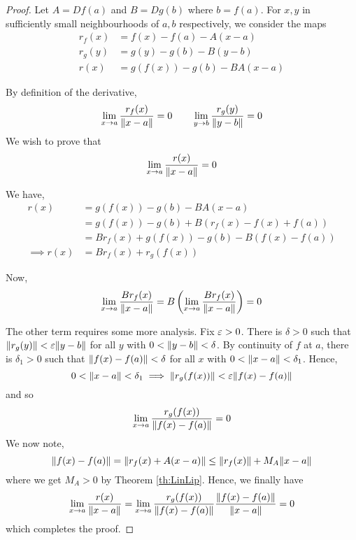 \documentclass[../Analysis-3.tex]{subfiles}
\begin{document}
\begin{proof}
  Let $ A = Df(a) $ and $ B = Dg(b) $ where $ b = f(a) $. For $ x,y $ in sufficiently small neighbourhoods of $ a,b $ respectively, we consider the maps
  \begin{align*}
    r_f(x) & = f(x) - f(a) - A(x-a)     \\
    r_g(y) & = g(y) - g(b) - B(y-b)     \\
    r(x)   & = g(f(x)) - g(b) - BA(x-a)
  \end{align*}

  By definition of the derivative,
  \[ \lim_{x \to a}\frac{r_f(x)}{\norm{x-a}}=0 \qquad \lim_{y \to b}\frac{r_g(y)}{\norm{y-b}}=0\]
  We wish to prove that
  \[ \lim_{x \to a}\frac{r(x)}{\norm{x-a}}=0 \]

  We have,
  \begin{align*}
    r(x)          & = g(f(x)) - g(b) - BA(x-a)                \\
                  & = g(f(x)) - g(b) + B(r_f(x) - f(x)+f(a))  \\
                  & = Br_f(x) + g(f(x)) - g(b) - B(f(x)-f(a)) \\
    \implies r(x) & = Br_f(x) + r_g(f(x))
  \end{align*}

  Now,
  \[ \lim_{x \to a}\frac{Br_f(x)}{\norm{x-a}} = B \left(\lim_{x \to a}\frac{Br_f(x)}{\norm{x-a}}\right) = 0 \]\ssk

  The other term requires some more analysis. Fix $ \varepsilon > 0 $. There is $ \delta > 0 $ such that $ \norm{r_g(y)} < \varepsilon \norm{y-b} $ for all $ y $ with $ 0 < \norm{y-b} < \delta $. By continuity of $ f $ at $ a $, there is $ \delta_1 > 0 $ such that $ \norm{f(x) - f(a)} < \delta $ for all $ x $ with $ 0 < \norm{x-a} < \delta_1 $. Hence,
  \[ 0 < \norm{x-a} < \delta_1 \implies \norm{r_g(f(x))} < \varepsilon\norm{f(x)-f(a)} \]
  and so
  \[ \lim_{x \to a}\frac{r_g(f(x))}{\norm{f(x)-f(a)}} = 0 \]
  We now note,
  \[ \norm{f(x)-f(a)} = \norm{r_f(x)+A(x-a)} \leq \norm{r_f(x)} + M_A\norm{x-a} \]
  where we get $ M_A > 0 $ by Theorem \ref{th:LinLip}. Hence, we finally have
  \[ \lim_{x \to a}\frac{r(x)}{\norm{x-a}} = \lim_{x \to a}\frac{r_g(f(x))}{\norm{f(x)-f(a)}} \frac{\norm{f(x)-f(a)}}{\norm{x-a}} = 0 \]
  which completes the proof.
\end{proof}
\end{document}
